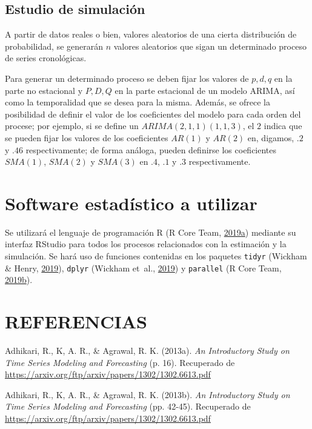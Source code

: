 \documentclass[]{article}
\begin{document}
\subsection{Estudio de simulación}

A partir de datos reales o bien, valores aleatorios de una cierta
distribución de probabilidad, se generarán \(n\) valores aleatorios que
sigan un determinado proceso de series cronológicas.

Para generar un determinado proceso se deben fijar los valores de
\(p,d,q\) en la parte no estacional y \(P,D,Q\) en la parte estacional
de un modelo ARIMA, así como la temporalidad que se desea para la misma.
Además, se ofrece la posibilidad de definir el valor de los coeficientes
del modelo para cada orden del procese; por ejemplo, si se define un
\(ARIMA(2,1,1)(1,1,3)\), el \(2\) indica que se pueden fijar los valores
de los coeficientes \(AR(1)\) y \(AR(2)\) en, digamos, \(.2\) y \(.46\)
respectivamente; de forma análoga, pueden definirse los coeficientes
\(SMA(1)\), \(SMA(2)\) y \(SMA(3)\) en \(.4\), \(.1\) y \(.3\)
respectivamente.

\section{Software estadístico a utilizar}

Se utilizará el lenguaje de programación R (R Core Team,
\protect\hyperlink{ref-Rbase}{2019}\protect\hyperlink{ref-Rbase}{a})
mediante su interfaz RStudio para todos los procesos relacionados con la
estimación y la simulación. Se hará uso de funciones contenidas en los
paquetes \texttt{tidyr} (Wickham \& Henry,
\protect\hyperlink{ref-tidyr}{2019}), \texttt{dplyr} (Wickham et~al.,
\protect\hyperlink{ref-dplyr}{2019}) y \texttt{parallel} (R Core Team,
\protect\hyperlink{ref-parallel}{2019}\protect\hyperlink{ref-parallel}{b}).

\section{REFERENCIAS}

\hypertarget{refs}{}
\leavevmode\hypertarget{ref-diferenciacion}{}%
Adhikari, R., K, A. R., \& Agrawal, R. K. (2013a). \emph{An Introductory
Study on Time Series Modeling and Forecasting} (p. 16). Recuperado de
\url{https://arxiv.org/ftp/arxiv/papers/1302/1302.6613.pdf}

\leavevmode\hypertarget{ref-medidas}{}%
Adhikari, R., K, A. R., \& Agrawal, R. K. (2013b). \emph{An Introductory
Study on Time Series Modeling and Forecasting} (pp. 42-45). Recuperado
de \url{https://arxiv.org/ftp/arxiv/papers/1302/1302.6613.pdf}
\end{document}
